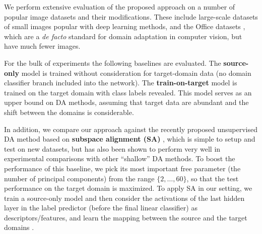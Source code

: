 \def\X{{\mathbf X}}
\def\y{{\mathbf y}}




We perform extensive evaluation of the proposed approach on a number of popular image datasets and their modifications. These include large-scale datasets of small images popular with deep learning methods, and the {\sc Office} datasets \cite{Saenko10}, which are a {\em de facto} standard for domain adaptation in computer vision, but have much fewer images.

\vspace{2mm} For the bulk of experiments the following baselines are evaluated. The \textbf{source-only} model is trained without consideration for target-domain data (no domain classifier branch included into the network). The \textbf{train-on-target} model is trained on the target domain with class labels revealed. This model serves as an upper bound on DA methods, assuming that target data are abundant and the shift between the domains is considerable. 

In addition, we compare our approach against the recently proposed unsupervised DA method based on \textbf{subspace alignment (SA)} \cite{Fernando13}, which is simple to setup and test on new datasets, but has also been shown to perform very well in experimental comparisons with other ``shallow'' DA methods. To boost the performance of this baseline, we pick its most important free parameter (the number of principal components) from the range $ \{ 2, \ldots, 60 \} $, so that the test performance on the target domain is maximized. To apply SA in our setting, we train a source-only model and then consider the activations of the last hidden layer in the label predictor (before the final linear classifier) as descriptors/features, and learn the mapping between the source and the target domains \cite{Fernando13}.

